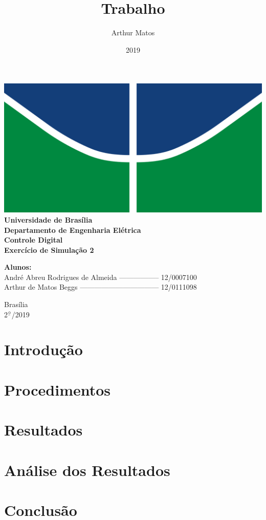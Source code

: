 \documentclass{article}
\title{Trabalho}
\author{Arthur Matos}
\date{2019}
\newcommand{\ubar}[1]{\underaccent{\bar}{#1}}
\begin{document}
\begin{titlepage}
    \begin{center}
        \centering
        \includegraphics[width=.7\linewidth]{images/logo_unb.png}\\[0.5cm]
        {\large \textbf{Universidade de Brasília}}\\[0.2cm]
        {\large \textbf{Departamento de Engenharia Elétrica}}\\[0.2cm]
        {\large \textbf{Controle Digital}}\\[4.8cm]
        {\bf \huge {Exercício de Simulação 2}}\\[0.2cm]
        {\bf \large {}}
    \end{center}

    \vspace{5cm}
    \hspace{2cm} {\noindent \bf \large {Alunos:}}\\
    {\large André Abreu Rodrigues de Almeida ----------------- 12/0007100}\\[0.2cm]
    {\large Arthur de Matos Beggs --------------------------------- 12/0111098}\\[1cm]

    \begin{center}
        {\large Brasília}\\
        {\large 2$^{\ubar{\circ}}$/2019}
    \end{center}

\end{titlepage}
\clearpage
\setcounter{page}{2}
\clearpage




\section{Introdução}



\section{Procedimentos}


\section{Resultados}


\section{Análise dos Resultados}


\section{Conclusão}
\end{document}
